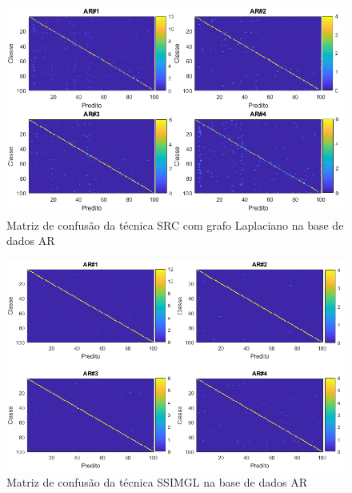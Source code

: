 \begin{figure}[H]
\caption{Matriz de confusão da técnica SRC com grafo Laplaciano na base de dados AR}
\centering
\includegraphics[scale = 0.65]{imgs4/matrizes_confusao/SRC_GL}
\end{figure}


\begin{figure}[H]
\caption{Matriz de confusão da técnica SSIMGL na base de dados AR}
\centering
\includegraphics[scale = 0.65]{imgs4/matrizes_confusao/ssimgl}
\end{figure}





